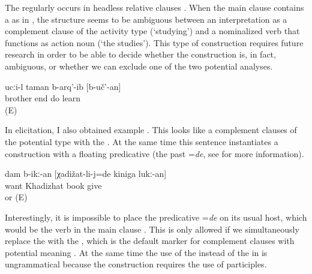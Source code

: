 The  regularly occurs in headless relative clauses . When the main clause contains a  as in , the structure seems to be ambiguous between an interpretation as a complement clause of the activity type (`studying') and a nominalized verb that functions as action noun (`the studies'). This type of construction requires future research in order to be able to decide whether the construction is, in fact, ambiguous, or whether we can exclude one of the two potential analyses.
 	
\begin{exe}	
	\ex	\label{ex:‎Brother finished to study / studying / the studies}
	\gll	ucːi-l	taman	b-arq'-ib	[b-uč'-an]\\
		brother	end	do	learn\\
	\glt	{} (E)
\end{exe}


In elicitation, I also obtained example . This looks like a complement clauses of the potential type with the . At the same time this sentence instantiates a  construction with a floating predicative  (the past  =\textit{de}, see  for more information). 

%
\begin{exe}
	\ex	\label{ex:‎I wanted to give the book to Khadizhat}
	\gll	dam	b-ikː-an	[χadižat-li-j=de	kiniga	lukː-an]\\
			want	Khadizhat	book	give\\
	\glt	{} or  (E)
	\end{exe}

Interestingly, it is impossible to place the predicative  =\textit{de} on its usual host, which would be the verb in the main clause . This is only allowed if we simultaneously replace the  with the , which is the default marker for complement clauses with potential meaning . At the same time the use of the  instead of the  in  is ungrammatical because the  construction requires the use of participles.

